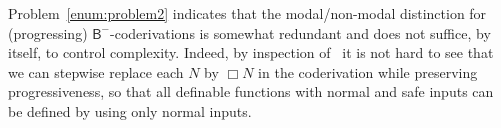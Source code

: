 \documentclass[manuscript,screen]{acmart}
\theoremstyle{definition}
\theoremstyle{remark}
\newcommand{\n}{N}
\newcommand{\sq}{\Box}
\newcommand{\sqn}{{\sq\n}}
\newcommand{\sn}{\sqn}
\newcommand{\bc}{\mathsf{B}}
\newcommand{\bcnorec}{\bc^{-}}
\newcommand{\seqar}{\Rightarrow}
\newcommand{\der}{\mathcal{D}}
\newcommand{\pder}[1]{\der_{#1}}
\newcommand{\id}{\mathsf{id}}
\newcommand{\cut}{\mathsf{cut}}
\newcommand{\boxlef}{\sq_l}
\newcommand{\boxrig}{\sq_r}
\newcommand{\sql}{\boxlef}
\newcommand{\sqr}{\boxrig}
\begin{document}


Problem~\ref{enum:problem2} indicates that the modal/non-modal distinction for (progressing) $\bcnorec$-coderivations is somewhat redundant and does not suffice, by itself, to control complexity.  
Indeed, by inspection of~ it is not hard to see that we can stepwise replace each $\n$ by $\sn$ in the coderivation while preserving progressiveness, so that all definable functions with normal and safe inputs can be defined by using only normal inputs. 
\end{document}
